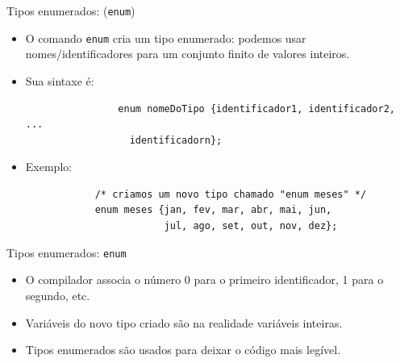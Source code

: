 \documentclass[handout]{beamer}
\begin{document}
\begin{frame}[fragile]{Tipos enumerados: (\texttt{enum})}

    \begin{itemize}
        \item O comando \texttt{enum} cria um tipo enumerado:
        podemos usar nomes/identificadores para um conjunto finito
        de valores inteiros.

        \item Sua sintaxe é:

        \begin{block}{}
            \begin{verbatim}
                enum nomeDoTipo {identificador1, identificador2, ...
                  identificadorn};
            \end{verbatim}
        \end{block}

        \item Exemplo:
        \begin{verbatim}
            /* criamos um novo tipo chamado "enum meses" */
            enum meses {jan, fev, mar, abr, mai, jun,
                        jul, ago, set, out, nov, dez};

        \end{verbatim}
    \end{itemize}

\end{frame}

\begin{frame}[fragile]{Tipos enumerados: \texttt{enum}}

    \begin{itemize}
        \item O compilador associa o número 0 para o primeiro
        identificador, 1 para o segundo, etc.
        \item Variáveis do novo tipo criado são na realidade variáveis
        inteiras.
        \item Tipos enumerados são usados para deixar o código mais
        legível.
    \end{itemize}

\end{frame}
\end{document}
